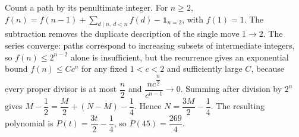 Count a path by its penultimate integer. For $n\ge2$, $f(n)=f(n-1)+\sum_{d\mid n,\ d<n}f(d)-\mathbf1_{n=2}$, with $f(1)=1$. The subtraction removes the duplicate description of the single move $1\to2$. The series converge: paths correspond to increasing subsets of intermediate integers, so $f(n)\le2^{n-2}$ alone is insufficient, but the recurrence gives an exponential bound $f(n)\le Cc^n$ for any fixed $1<c<2$ and sufficiently large $C$, because every proper divisor is at most $\dfrac{n}{2}$ and $\dfrac{n c^{\dfrac{n}{2}}}{c^{n-1}} \to 0$. Summing after division by $2^n$ gives $M - \dfrac{1}{2} = \dfrac{M}{2} + (N-M) - \dfrac{1}{4}$. Hence $\boxed{N = \dfrac{3 M}{2} - \dfrac{1}{4}}$. The resulting polynomial is $P (t) = \dfrac{3 t}{2} - \dfrac{1}{4}$, so $\boxed{P (45) = \dfrac{269}{4}}$.

